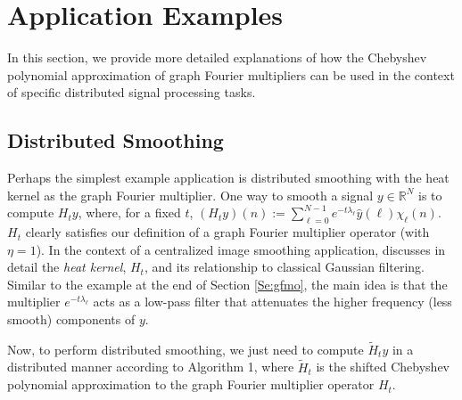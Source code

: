 \documentclass[conference]{IEEEtran}
\renewcommand{\l}{\ell}
\newcommand{\Rbb}{\mathbb{R}}
\begin{document}
\section{Application Examples}\label{Se:applications}
In this section, we provide more detailed explanations of how the Chebyshev polynomial approximation of graph Fourier multipliers can be used in the context of specific distributed signal processing tasks.
\subsection{Distributed Smoothing}
Perhaps the simplest example application is distributed smoothing with the heat kernel as the graph Fourier multiplier. One way to smooth a signal $y\in \Rbb^N$ is to compute $H_t y$, where, for a fixed $t$,
$(H_ty)(n):=\sum_{\l=0}^{N-1} e^{-t\lambda_{\l}}\hat{y}(\l)\chi_{\l}(n)$.
$H_t$ clearly satisfies our definition of a graph Fourier multiplier operator (with $\eta=1$).
In the context of a centralized image smoothing application, \cite{hancock} discusses in detail the \emph{heat kernel}, $H_t$, and its relationship to classical Gaussian filtering. Similar to the example at the end of Section \ref{Se:gfmo}, the main idea is that the multiplier $e^{-t\lambda_{\l}}$ acts as a low-pass filter that attenuates the higher frequency (less smooth) components of $y$.

Now, to perform distributed smoothing, we just need to compute $\tilde{H}_t y$ in a distributed manner according to Algorithm 1, where $\tilde{H}_t$ is the shifted Chebyshev polynomial approximation to the graph Fourier multiplier operator $H_t$.
\end{document}
